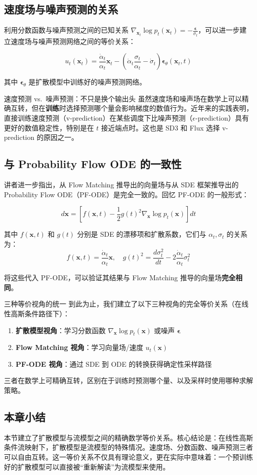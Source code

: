 \subsection{速度场与噪声预测的关系}

利用分数函数与噪声预测之间的已知关系 $\nabla_{\mathbf{x}_t} \log p_t(\mathbf{x}_t) = -\frac{\boldsymbol{\epsilon}}{\sigma_t}$，可以进一步建立速度场与噪声预测网络之间的等价关系：

$$u_t(\mathbf{x}_t) = \frac{\dot{\alpha}_t}{\alpha_t} \mathbf{x}_t - \left(\dot{\alpha}_t \frac{\sigma_t}{\alpha_t} - \dot{\sigma}_t\right) \boldsymbol{\epsilon}_\theta(\mathbf{x}_t, t)$$

其中 $\boldsymbol{\epsilon}_\theta$ 是扩散模型中训练好的噪声预测网络。

\begin{warningbox}{速度预测 vs.\ 噪声预测：不只是换个输出头}
虽然速度场和噪声场在数学上可以精确互转，但在\textbf{训练}时选择预测哪个量会影响梯度的数值行为。近年来的实践表明，直接训练速度预测（v-prediction）在某些调度下比噪声预测（$\epsilon$-prediction）具有更好的数值稳定性，特别是在 $t$ 接近端点时。这也是 SD3 和 Flux 选择 v-prediction 的原因之一。
\end{warningbox}

\subsection{与 Probability Flow ODE 的一致性}

讲者进一步指出，从 Flow Matching 推导出的向量场与从 SDE 框架推导出的 Probability Flow ODE（PF-ODE）是完全一致的。回忆 PF-ODE 的一般形式：

$$d\mathbf{x} = \left[f(\mathbf{x}, t) - \frac{1}{2}g(t)^2 \nabla_\mathbf{x} \log p_t(\mathbf{x})\right] dt$$

其中 $f(\mathbf{x}, t)$ 和 $g(t)$ 分别是 SDE 的漂移项和扩散系数，它们与 $\alpha_t, \sigma_t$ 的关系为：
$$f(\mathbf{x}, t) = \frac{\dot{\alpha}_t}{\alpha_t} \mathbf{x}, \quad g(t)^2 = \frac{d\sigma_t^2}{dt} - 2\frac{\dot{\alpha}_t}{\alpha_t}\sigma_t^2$$

将这些代入 PF-ODE，可以验证其结果与 Flow Matching 推导的向量场\textbf{完全相同}。

\begin{importantbox}{三种等价视角的统一}
到此为止，我们建立了以下三种视角的完全等价关系（在线性高斯条件路径下）：
\begin{enumerate}
    \item \textbf{扩散模型视角}：学习分数函数 $\nabla_\mathbf{x} \log p_t(\mathbf{x})$ 或噪声 $\boldsymbol{\epsilon}$
    \item \textbf{Flow Matching 视角}：学习向量场/速度 $u_t(\mathbf{x})$
    \item \textbf{PF-ODE 视角}：通过 SDE 到 ODE 的转换获得确定性采样路径
\end{enumerate}
三者在数学上可精确互转，区别在于训练时预测哪个量、以及采样时使用哪种求解策略。
\end{importantbox}

\subsection{本章小结}

本节建立了扩散模型与流模型之间的精确数学等价关系。核心结论是：在线性高斯条件流映射下，扩散模型是流模型的特殊情况。速度场、分数函数、噪声预测三者可以自由互转。这一等价关系不仅具有理论意义，更在实际中意味着：一个预训练好的扩散模型可以直接被``重新解读''为流模型来使用。

